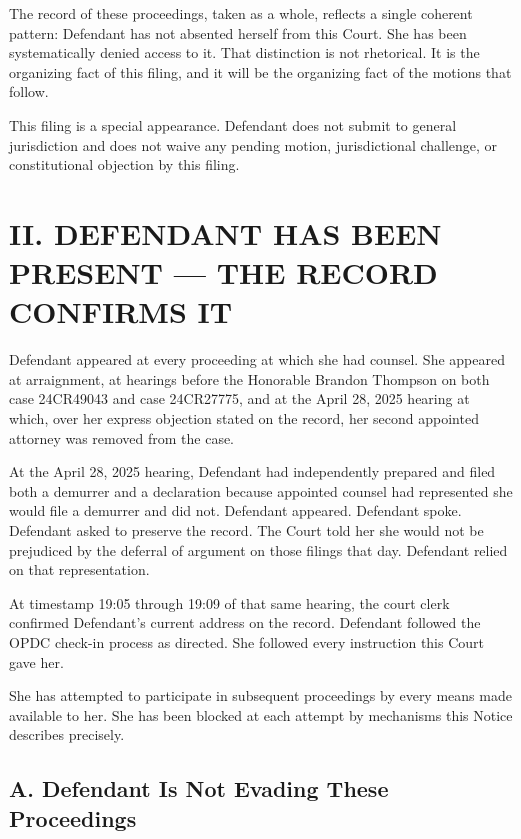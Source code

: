 \documentclass[12pt,letterpaper]{article}
\begin{document}
The record of these proceedings, taken as a whole, reflects a single coherent
pattern: Defendant has not absented herself from this Court. She has been
systematically denied access to it. That distinction is not rhetorical. It is the
organizing fact of this filing, and it will be the organizing fact of the motions
that follow.

This filing is a special appearance. Defendant does not submit to general
jurisdiction and does not waive any pending motion, jurisdictional challenge, or
constitutional objection by this filing.


\section*{II. DEFENDANT HAS BEEN PRESENT --- THE RECORD CONFIRMS IT}

Defendant appeared at every proceeding at which she had counsel. She appeared at
arraignment, at hearings before the Honorable Brandon Thompson on both case
24CR49043 and case 24CR27775, and at the April 28, 2025 hearing at which, over
her express objection stated on the record, her second appointed attorney was
removed from the case.

At the April 28, 2025 hearing, Defendant had independently prepared and filed both
a demurrer and a declaration because appointed counsel had represented she would
file a demurrer and did not. Defendant appeared. Defendant spoke. Defendant asked
to preserve the record. The Court told her she would not be prejudiced by the
deferral of argument on those filings that day. Defendant relied on that
representation.

At timestamp 19:05 through 19:09 of that same hearing, the court clerk confirmed
Defendant's current address on the record. Defendant followed the OPDC check-in
process as directed. She followed every instruction this Court gave her.

She has attempted to participate in subsequent proceedings by every means made
available to her. She has been blocked at each attempt by mechanisms this Notice
describes precisely.

\subsection*{A. Defendant Is Not Evading These Proceedings}
\end{document}
